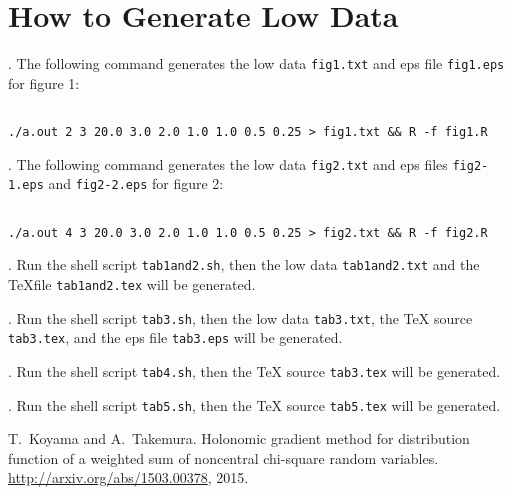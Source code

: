 \documentclass{article}
\begin{document}
\section{How to Generate Low Data}
\/.
The following command generates the low data {\tt fig1.txt}
and eps file {\tt fig1.eps} for figure 1:
\begin{lstlisting}[style=BashInputStyle]

./a.out 2 3 20.0 3.0 2.0 1.0 1.0 0.5 0.25 > fig1.txt && R -f fig1.R
\end{lstlisting}

\medskip{}\/.
The following command generates the low data {\tt fig2.txt}
and eps files {\tt fig2-1.eps} and {\tt fig2-2.eps} for figure 2:
\begin{lstlisting}[style=BashInputStyle]

./a.out 4 3 20.0 3.0 2.0 1.0 1.0 0.5 0.25 > fig2.txt && R -f fig2.R
\end{lstlisting}

\medskip{}\/.
Run the shell script {\tt tab1and2.sh}, then the low data {\tt tab1and2.txt} and 
the \TeX file {\tt tab1and2.tex} will be generated.

\medskip{}\/.
Run the shell script {\tt tab3.sh}, then the low data {\tt tab3.txt}, 
the TeX source {\tt tab3.tex}, and the eps file {\tt tab3.eps} will be generated.

\medskip{}\/.
Run the shell script {\tt tab4.sh}, then the TeX source {\tt tab3.tex} will be
generated.

\medskip{}\/.
Run the shell script {\tt tab5.sh}, then the TeX source {\tt tab5.tex} will be
generated.

\iftrue

\begin{thebibliography}{1}

T.~Koyama and A.~Takemura.
\newblock Holonomic gradient method for distribution function of a weighted sum
  of noncentral chi-square random variables.
\newblock \url{http://arxiv.org/abs/1503.00378}, 2015.

\end{thebibliography}

\else




\fi

\end{document}
